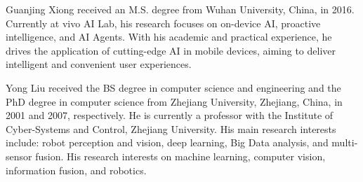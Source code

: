 \vspace{-3em}

\begin{IEEEbiography}{Guanjing Xiong}
received an M.S. degree from Wuhan University, China, in 2016. Currently at vivo AI Lab, his research focuses on on-device AI, proactive intelligence, and AI Agents. With his academic and practical experience, he drives the application of cutting-edge AI in mobile devices, aiming to deliver intelligent and convenient user experiences.
\end{IEEEbiography}

\vspace{-3em}

\begin{IEEEbiography}{Yong Liu}
received the BS degree in computer science and engineering and the PhD degree in computer science from Zhejiang University, Zhejiang, China, in 2001 and 2007, respectively. He is currently a professor with the Institute of Cyber-Systems and Control, Zhejiang University. His main research interests include: robot perception and vision, deep learning, Big Data analysis, and multi-sensor fusion. His research interests on machine learning, computer vision, information fusion, and robotics.
\end{IEEEbiography} 

\vspace{-3em}

